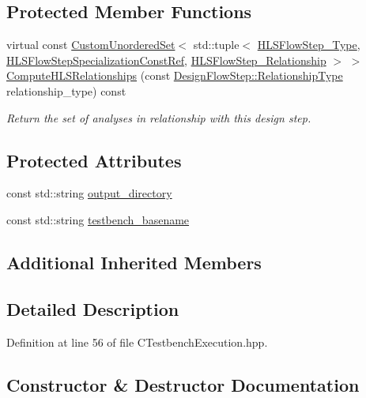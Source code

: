 \subsection*{Protected Member Functions}
\begin{DoxyCompactItemize}
\item 
virtual const \hyperlink{classCustomUnorderedSet}{Custom\+Unordered\+Set}$<$ std\+::tuple$<$ \hyperlink{hls__step_8hpp_ada16bc22905016180e26fc7e39537f8d}{H\+L\+S\+Flow\+Step\+\_\+\+Type}, \hyperlink{hls__step_8hpp_a5fdd2edf290c196531d21d68e13f0e74}{H\+L\+S\+Flow\+Step\+Specialization\+Const\+Ref}, \hyperlink{hls__step_8hpp_a3ad360b9b11e6bf0683d5562a0ceb169}{H\+L\+S\+Flow\+Step\+\_\+\+Relationship} $>$ $>$ \hyperlink{classCTestbenchExecution_afcca0fd1ecbe9fe41b06a405be0ad67c}{Compute\+H\+L\+S\+Relationships} (const \hyperlink{classDesignFlowStep_a723a3baf19ff2ceb77bc13e099d0b1b7}{Design\+Flow\+Step\+::\+Relationship\+Type} relationship\+\_\+type) const
\begin{DoxyCompactList}\small\item\em Return the set of analyses in relationship with this design step. \end{DoxyCompactList}\end{DoxyCompactItemize}
\subsection*{Protected Attributes}
\begin{DoxyCompactItemize}
\item 
const std\+::string \hyperlink{classCTestbenchExecution_a9394f004c8c52a187243f5c924180d80}{output\+\_\+directory}
\item 
const std\+::string \hyperlink{classCTestbenchExecution_ab4ede64e226a637b246ff924c69ec629}{testbench\+\_\+basename}
\end{DoxyCompactItemize}
\subsection*{Additional Inherited Members}


\subsection{Detailed Description}


Definition at line 56 of file C\+Testbench\+Execution.\+hpp.



\subsection{Constructor \& Destructor Documentation}
\mbox{\label{classCTestbenchExecution_a9e90aae59cc30f1b49deb86eb584abeb}} 
